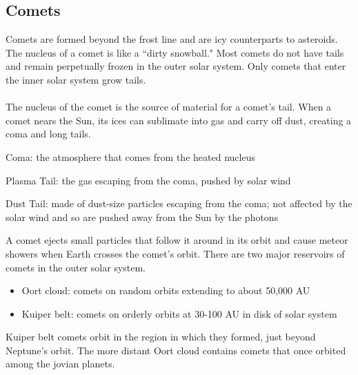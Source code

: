 \documentclass[12pt]{article}
\begin{document}
\subsection{Comets}
Comets are formed beyond the frost line and are icy counterparts to asteroids. The nucleus of a comet is like a ``dirty snowball." Most comets do not have tails and remain perpetually frozen in the outer solar system. Only comets that enter the inner solar system grow tails. \\~\\
The nucleus of the comet is the source of material for a comet's tail. When a comet nears the Sun, its ices can sublimate into gas and carry off dust, creating a coma and long tails. 
\begin{definition} Coma: the atmosphere that comes from the heated nucleus \end{definition}
\begin{definition} Plasma Tail: the gas escaping from the coma, pushed by solar wind \end{definition}
\begin{definition} Dust Tail: made of dust-size particles escaping from the coma; not affected by the solar wind and so are pushed away from the Sun by the photons \end{definition}
A comet ejects small particles that follow it around in its orbit and cause meteor showers when Earth crosses the comet's orbit. \newpage
There are two major reservoirs of comets in the outer solar system. \begin{itemize} 
\item Oort cloud: comets on random orbits extending to about 50,000 AU 
\item Kuiper belt: comets on orderly orbits at 30-100 AU in disk of solar system \end{itemize} 
Kuiper belt comets orbit in the region in which they formed, just beyond Neptune's orbit. The more distant Oort cloud contains comets that once orbited among the jovian planets. 
\end{document}
